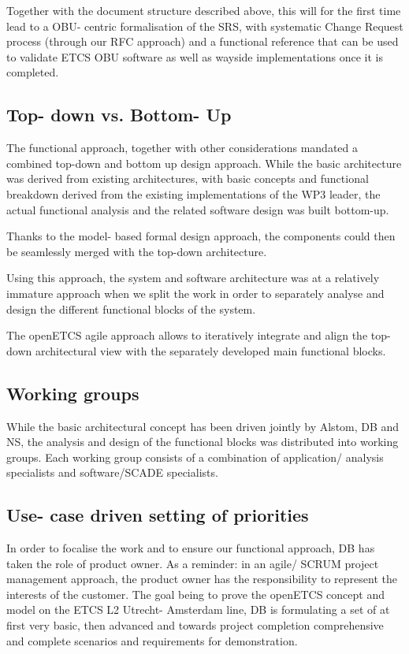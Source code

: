 Together with the document structure described above, this will for the first time lead to a OBU- centric formalisation of the SRS, with systematic Change Request process (through our RFC approach) and a functional reference that can be used to validate ETCS OBU software as well as wayside implementations once it is completed.

\subsection{Top- down vs. Bottom- Up}

The functional approach, together with other considerations mandated a combined top-down and bottom up design approach.
While the basic architecture was derived from existing architectures, with basic concepts and functional breakdown derived from the existing implementations of the WP3 leader, the actual functional analysis and the related software design was built bottom-up.

Thanks to the model- based formal design approach, the components could then be seamlessly merged with the top-down architecture.

Using this approach, the system and software architecture was at a relatively immature approach when we split the work in order to separately analyse and design the different functional blocks of the system.

The openETCS agile approach allows to iteratively integrate and align the top-down architectural view with the separately developed main functional blocks.


\subsection{Working groups}

While the basic architectural concept has been driven jointly by Alstom, DB and NS, the analysis and design of the functional blocks was distributed into working groups. Each working group consists of a combination of application/ analysis specialists and software/SCADE specialists.

\subsection{Use- case driven setting of priorities}

In order to focalise the work and to ensure our functional approach, DB has taken the role of product owner. 
As a reminder: in an agile/ SCRUM project management approach, the product owner has the responsibility to represent the interests of the customer.
The goal being to prove the openETCS concept and model on the ETCS L2 Utrecht- Amsterdam line, DB is formulating a set of at first very basic, then advanced and towards project completion comprehensive and complete scenarios and requirements for demonstration.

